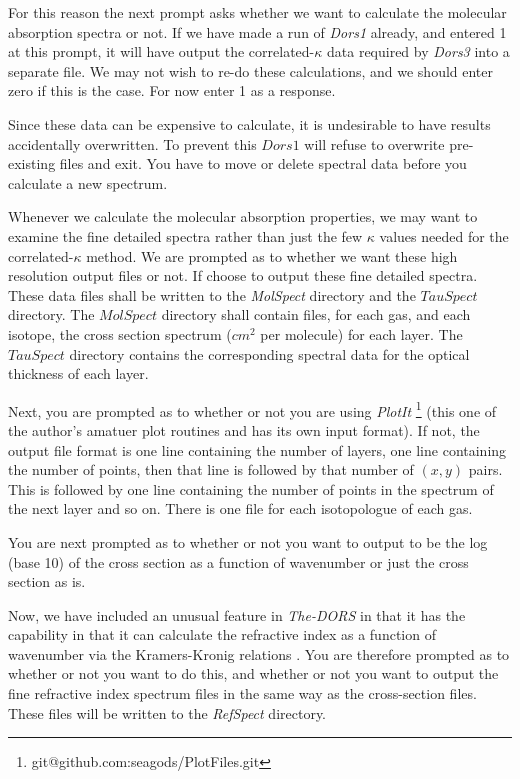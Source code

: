 \documentclass[12pt]{article}
\begin{document}
For this reason the next prompt asks whether we want to calculate the molecular absorption spectra or not.
If we have made a run of {\it Dors1} already, and entered 1 at this prompt, it will have output the
correlated-$\kappa$ data required by {\it Dors3} into a separate file. 
We may not wish to re-do these calculations, and we should enter zero if this is the case.
For now enter 1 as a response. 

Since these data can
be expensive to calculate, it is undesirable to have results accidentally overwritten.
To prevent this $Dors1$ will refuse to overwrite pre-existing files and exit.
You have to move or delete spectral data before you calculate a new spectrum.

Whenever we calculate the molecular absorption properties, we may want to examine the fine
detailed spectra rather than just the few $\kappa$ values needed for the correlated-$\kappa$ method.
We are prompted as to whether we want these high resolution output files or not. If choose to output these fine detailed spectra.
These data files shall be written to the {\it MolSpect} directory
 and the $TauSpect$ directory. The $MolSpect$ directory shall contain files, for each gas, and each isotope,
 the cross section spectrum  ($cm^2$ per molecule) for each layer. The $TauSpect$ directory contains
the corresponding spectral data for the optical thickness of each layer. 

Next,  you are prompted as to whether or not you are using {\it PlotIt}
  \footnote[1]{git@github.com:seagods/PlotFiles.git} (this one of the author's amatuer plot routines
 and has its own input format). 
 If not, the output file
format is one line containing the number of layers, one line containing the number of points, then that line is
followed by that number of $(x,y)$ pairs. This is followed by one line containing the number of points in the spectrum
of the next layer and so on. There is one file for each isotopologue of each gas. 

You are next prompted as to whether
or not you want to output to be the log (base 10) of the cross section as a function of wavenumber
 or just the cross section as is.

Now, we have included an unusual feature in {\it The-DORS} in that it has the capability  in that it
 can calculate the refractive index
as a function of wavenumber via the Kramers-Kronig relations \cite{KronKram1:mybib}. 
You are therefore prompted as to whether or not you want to do this, and whether or
not you want to output the fine refractive index spectrum files in the same way as the cross-section files.
These files will be written to the {\it RefSpect} directory.
\end{document}
